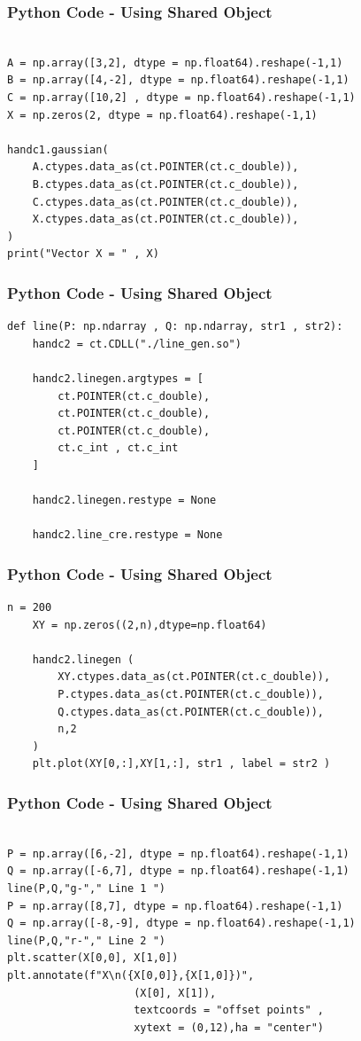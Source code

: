\documentclass{beamer}
\begin{document}
\begin{frame}[fragile]
    \frametitle{Python Code - Using Shared Object}
    \begin{lstlisting}

A = np.array([3,2], dtype = np.float64).reshape(-1,1)
B = np.array([4,-2], dtype = np.float64).reshape(-1,1)
C = np.array([10,2] , dtype = np.float64).reshape(-1,1)
X = np.zeros(2, dtype = np.float64).reshape(-1,1)

handc1.gaussian(
    A.ctypes.data_as(ct.POINTER(ct.c_double)),
    B.ctypes.data_as(ct.POINTER(ct.c_double)),
    C.ctypes.data_as(ct.POINTER(ct.c_double)),
    X.ctypes.data_as(ct.POINTER(ct.c_double)),
)
print("Vector X = " , X)

\end{lstlisting}
\end{frame}

\begin{frame}[fragile]
    \frametitle{Python Code - Using Shared Object}
    \begin{lstlisting}
def line(P: np.ndarray , Q: np.ndarray, str1 , str2):
    handc2 = ct.CDLL("./line_gen.so")

    handc2.linegen.argtypes = [
        ct.POINTER(ct.c_double),
        ct.POINTER(ct.c_double),
        ct.POINTER(ct.c_double),
        ct.c_int , ct.c_int
    ]

    handc2.linegen.restype = None

    handc2.line_cre.restype = None
\end{lstlisting}
\end{frame}
\begin{frame}[fragile]
    \frametitle{Python Code - Using Shared Object}
    \begin{lstlisting}
n = 200
    XY = np.zeros((2,n),dtype=np.float64)

    handc2.linegen (
        XY.ctypes.data_as(ct.POINTER(ct.c_double)),
        P.ctypes.data_as(ct.POINTER(ct.c_double)),
        Q.ctypes.data_as(ct.POINTER(ct.c_double)),
        n,2
    )
    plt.plot(XY[0,:],XY[1,:], str1 , label = str2 )
    \end{lstlisting}
\end{frame}

\begin{frame}[fragile]
    \frametitle{Python Code - Using Shared Object}
    \begin{lstlisting}

P = np.array([6,-2], dtype = np.float64).reshape(-1,1)
Q = np.array([-6,7], dtype = np.float64).reshape(-1,1)
line(P,Q,"g-"," Line 1 ")
P = np.array([8,7], dtype = np.float64).reshape(-1,1)
Q = np.array([-8,-9], dtype = np.float64).reshape(-1,1)
line(P,Q,"r-"," Line 2 ")
plt.scatter(X[0,0], X[1,0])
plt.annotate(f"X\n({X[0,0]},{X[1,0]})",
                    (X[0], X[1]),
                    textcoords = "offset points" ,
                    xytext = (0,12),ha = "center")

\end{lstlisting}
\end{frame}
\end{document}
